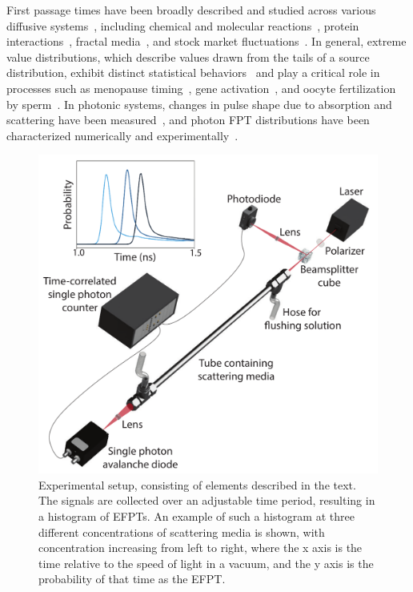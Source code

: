First passage times have been broadly described and studied across various diffusive systems~\cite{redner_8_2001,weiss_applications_2002,godec_first_2016,noskowicz_average_1988}, including chemical and molecular reactions~\cite{redner_8_2001,grebenkov_molecular_2021}, protein interactions~\cite{polizzi_mean_2016}, fractal media~\cite{chun_heterogeneous_2023}, and stock market fluctuations~\cite{barney_first-passage-time_2017,zsurkis_first_2024}. In general, extreme value distributions, which describe values drawn from the tails of a source distribution, exhibit distinct statistical behaviors~\cite{lawley_distribution_2020,lawley_universal_2020} and play a critical role in processes such as menopause timing~\cite{lawley_slowest_2023}, gene activation~\cite{schuss_redundancy_2019}, and oocyte fertilization by sperm~\cite{meerson_mortality_2015,schuss_redundancy_2019}.  In photonic systems, changes in pulse shape due to absorption and scattering have been measured~\cite{lee_using_2007,madsen_experimental_1992,ishimaru_diffusion_1978,yoo_time-resolved_1990,yoo_when_1990,zhang_wave_2002,calba_ultrashort_2008}, and photon FPT distributions have been characterized numerically and experimentally~\cite{rossetto_isotropic_2022,long_particle_2001,weiss_applications_2002,zeller_light_2020}. 

\begin{figure}[htp]
\includegraphics[width=0.8\columnwidth]{Figures/exp-setup-3.pdf}
\caption{\label{fig:setup}  Experimental setup, consisting of elements described in the text. The signals are collected over an adjustable time period, resulting in a histogram of EFPTs. An example of such a histogram at three different concentrations of scattering media is shown, with concentration increasing from left to right, where the x axis is the time relative to the speed of light in a vacuum, and the y axis is the probability of that time as the EFPT.}
\end{figure}

